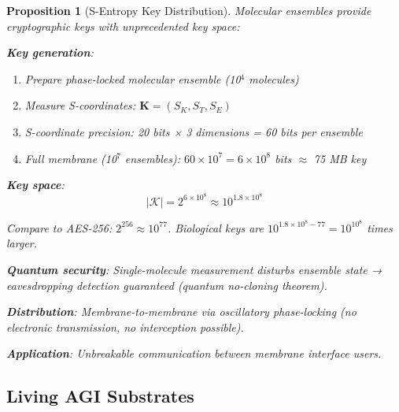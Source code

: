 \documentclass[11pt,a4paper]{article}
\newtheorem{proposition}[theorem]{Proposition}
\theoremstyle{definition}
\theoremstyle{remark}
\begin{document}
\begin{proposition}[S-Entropy Key Distribution]
Molecular ensembles provide cryptographic keys with unprecedented key space:

\textbf{Key generation}:
\begin{enumerate}
\item Prepare phase-locked molecular ensemble (10$^4$ molecules)
\item Measure S-coordinates: $\mathbf{K} = (S_K, S_T, S_E)$
\item S-coordinate precision: 20 bits × 3 dimensions = 60 bits per ensemble
\item Full membrane (10$^7$ ensembles): $60 \times 10^7 = 6 \times 10^8$ bits $\approx$ 75 MB key
\end{enumerate}

\textbf{Key space}:
\begin{equation}
|\mathcal{K}| = 2^{6 \times 10^8} \approx 10^{1.8 \times 10^8}
\end{equation}

Compare to AES-256: $2^{256} \approx 10^{77}$. Biological keys are $10^{1.8 \times 10^8 - 77} = 10^{10^8}$ times larger.

\textbf{Quantum security}: Single-molecule measurement disturbs ensemble state → eavesdropping detection guaranteed (quantum no-cloning theorem).

\textbf{Distribution}: Membrane-to-membrane via oscillatory phase-locking (no electronic transmission, no interception possible).

\textbf{Application}: Unbreakable communication between membrane interface users.
\end{proposition}

\subsection{Living AGI Substrates}
\end{document}

